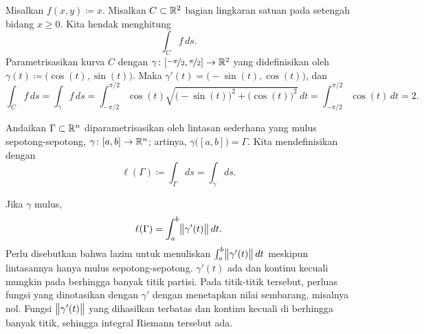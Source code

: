 \begin{example}
Misalkan $f(x,y) \coloneqq x$.  Misalkan $C \subset {\mathbb{R}}^2$ bagian lingkaran satuan
pada setengah bidang $x \geq 0$.  Kita hendak menghitung
\begin{equation*}
\int_C f \, ds .
\end{equation*}
Parametrisasikan kurva $C$ dengan $\gamma \colon
[\nicefrac{-\pi}{2},\nicefrac{\pi}{2}] \to {\mathbb{R}}^2$ yang didefinisikan oleh
$\gamma(t) \coloneqq \bigl(\cos(t),\sin(t)\bigr)$.
Maka $\gamma'(t) = \bigl(-\sin(t),\cos(t)\bigr)$, dan
\begin{equation*}
\int_C f \, ds =
\int_\gamma f \, ds
=
\int_{-\pi/2}^{\pi/2} \cos(t) \sqrt{ {\bigl(-\sin(t)\bigr)}^2 +  
{\bigl(\cos(t)\bigr)}^2 } \, dt
=
\int_{-\pi/2}^{\pi/2} \cos(t) \, dt = 2.
\end{equation*}
\end{example}

\begin{defn}
Andaikan $\Gamma \subset {\mathbb{R}}^n$ diparametrisasikan oleh lintasan sederhana
yang mulus sepotong-sepotong, $\gamma \colon [a,b] \to {\mathbb{R}}^n$; artinya,
$\gamma\bigl( [a,b] \bigr) = \Gamma$.  Kita mendefinisikan
\emph{} dengan
\begin{equation*}
\ell(\Gamma) \coloneqq \int_{\Gamma} ds = \int_{\gamma} ds .
\end{equation*}
\end{defn}

Jika $\gamma$ mulus,
\begin{equation*}
\ell(\Gamma) = 
\int_a^b
\bigl\lVert {\gamma'(t)} \bigr\rVert\, dt .
\end{equation*}
Perlu disebutkan bahwa lazim untuk menuliskan
$\int_a^b
\bigl\lVert {\gamma'(t)} \bigr\rVert\, dt$ meskipun lintasannya hanya mulus sepotong-sepotong.
$\gamma'(t)$ ada dan kontinu kecuali mungkin pada berhingga banyak titik partisi.
Pada titik-titik tersebut, perluas fungsi yang dinotasikan dengan $\gamma'$ dengan
menetapkan nilai sembarang, misalnya nol.  Fungsi $\bigl\lVert {\gamma'(t)} \bigr\rVert$ yang
dihasilkan terbatas dan kontinu kecuali di berhingga banyak titik, sehingga integral
Riemann tersebut ada.

